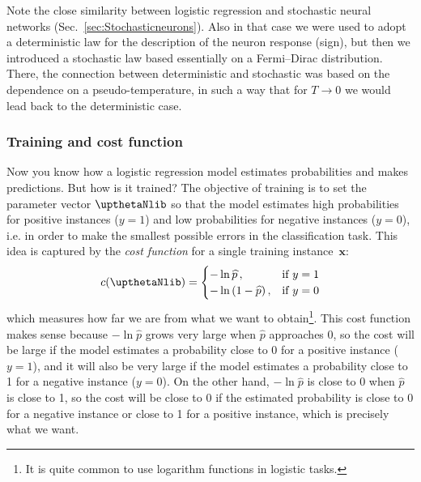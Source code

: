 Note the close similarity between logistic regression and stochastic neural networks (Sec.~\ref{sec:Stochasticneurons}). Also in that case we were used to adopt a deterministic law for the description of the neuron response (sign), but then we introduced a stochastic law based essentially on a Fermi--Dirac distribution. There, the connection between deterministic and stochastic was based on the dependence on a pseudo-temperature, in such a way that for $T\rightarrow0$ we would lead back to the deterministic case.
\subsubsection{Training and cost function}\label{subsubsec:Training_and_cost_function}
Now you know how a logistic regression model estimates probabilities and makes predictions. But how is it trained? The objective of training is to set the parameter vector $\boldtheta$ so that the model estimates high probabilities for positive instances ($y=1$) and low probabilities for negative instances ($y=0$), i.e. in order to make the smallest possible errors in the classification task. This idea is captured by the \emph{cost function} for a single training instance~$\mathbf{x}$:
\begin{equation}
c(\boldtheta)=\begin{cases}
-\ln{\widehat{p}}\,,&\text{if $y=1$}\\
-\ln{(1-\widehat{p})}\,,&\text{if $y=0$}
\end{cases}
\end{equation}
which measures how far we are from what we want to obtain\footnote{It is quite common to use logarithm functions in logistic tasks.}. This cost function makes sense because $-\ln{\widehat{p}}$ grows very large when $\widehat{p}$ approaches 0, so the cost will be large if the model estimates a probability close to 0 for a positive instance ($y=1$), and it will also be very large if the model estimates a probability close to 1 for a negative instance ($y=0$). On the other hand, $-\ln{\widehat{p}}$ is close to 0 when $\widehat{p}$ is close to 1, so the cost will be close to 0 if the estimated probability is close to 0 for a negative instance or close to 1 for a positive instance, which is precisely what we want.

